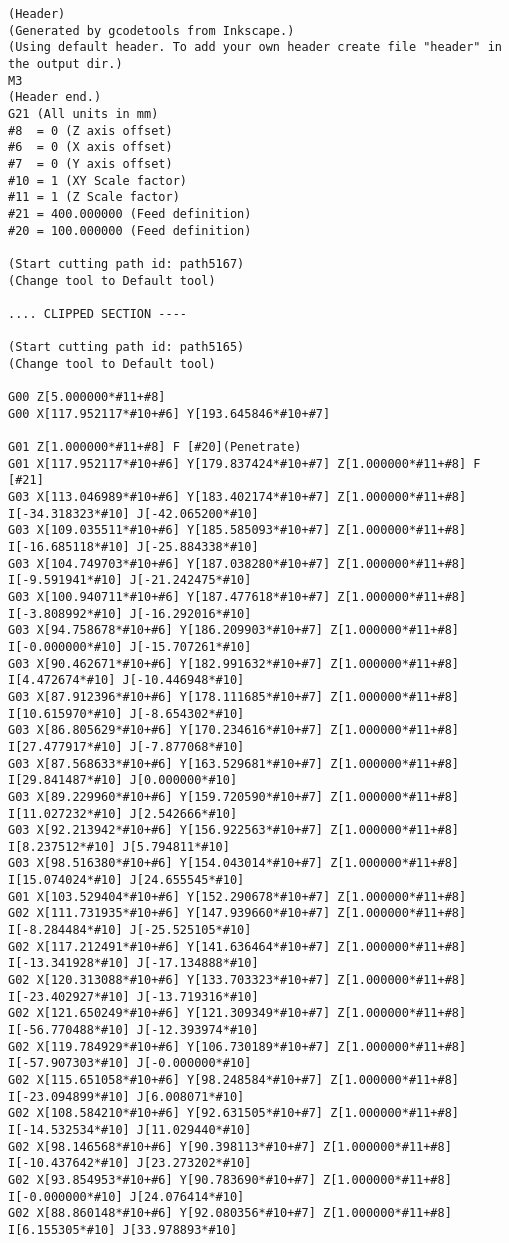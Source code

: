 \begin{lstlisting}[caption={App4-Display excerpt listing for 2D KSG G-Code}, label=App4-Display excerpt listing for 2D KSG G-Code]
%
(Header)
(Generated by gcodetools from Inkscape.)
(Using default header. To add your own header create file "header" in the output dir.)
M3
(Header end.)
G21 (All units in mm)
#8  = 0 (Z axis offset)
#6  = 0 (X axis offset)
#7  = 0 (Y axis offset)
#10 = 1 (XY Scale factor)
#11 = 1 (Z Scale factor)
#21 = 400.000000 (Feed definition)
#20 = 100.000000 (Feed definition)

(Start cutting path id: path5167)
(Change tool to Default tool)

.... CLIPPED SECTION ----

(Start cutting path id: path5165)
(Change tool to Default tool)

G00 Z[5.000000*#11+#8]
G00 X[117.952117*#10+#6] Y[193.645846*#10+#7]

G01 Z[1.000000*#11+#8] F [#20](Penetrate)
G01 X[117.952117*#10+#6] Y[179.837424*#10+#7] Z[1.000000*#11+#8] F [#21]
G03 X[113.046989*#10+#6] Y[183.402174*#10+#7] Z[1.000000*#11+#8] I[-34.318323*#10] J[-42.065200*#10]
G03 X[109.035511*#10+#6] Y[185.585093*#10+#7] Z[1.000000*#11+#8] I[-16.685118*#10] J[-25.884338*#10]
G03 X[104.749703*#10+#6] Y[187.038280*#10+#7] Z[1.000000*#11+#8] I[-9.591941*#10] J[-21.242475*#10]
G03 X[100.940711*#10+#6] Y[187.477618*#10+#7] Z[1.000000*#11+#8] I[-3.808992*#10] J[-16.292016*#10]
G03 X[94.758678*#10+#6] Y[186.209903*#10+#7] Z[1.000000*#11+#8] I[-0.000000*#10] J[-15.707261*#10]
G03 X[90.462671*#10+#6] Y[182.991632*#10+#7] Z[1.000000*#11+#8] I[4.472674*#10] J[-10.446948*#10]
G03 X[87.912396*#10+#6] Y[178.111685*#10+#7] Z[1.000000*#11+#8] I[10.615970*#10] J[-8.654302*#10]
G03 X[86.805629*#10+#6] Y[170.234616*#10+#7] Z[1.000000*#11+#8] I[27.477917*#10] J[-7.877068*#10]
G03 X[87.568633*#10+#6] Y[163.529681*#10+#7] Z[1.000000*#11+#8] I[29.841487*#10] J[0.000000*#10]
G03 X[89.229960*#10+#6] Y[159.720590*#10+#7] Z[1.000000*#11+#8] I[11.027232*#10] J[2.542666*#10]
G03 X[92.213942*#10+#6] Y[156.922563*#10+#7] Z[1.000000*#11+#8] I[8.237512*#10] J[5.794811*#10]
G03 X[98.516380*#10+#6] Y[154.043014*#10+#7] Z[1.000000*#11+#8] I[15.074024*#10] J[24.655545*#10]
G01 X[103.529404*#10+#6] Y[152.290678*#10+#7] Z[1.000000*#11+#8]
G02 X[111.731935*#10+#6] Y[147.939660*#10+#7] Z[1.000000*#11+#8] I[-8.284484*#10] J[-25.525105*#10]
G02 X[117.212491*#10+#6] Y[141.636464*#10+#7] Z[1.000000*#11+#8] I[-13.341928*#10] J[-17.134888*#10]
G02 X[120.313088*#10+#6] Y[133.703323*#10+#7] Z[1.000000*#11+#8] I[-23.402927*#10] J[-13.719316*#10]
G02 X[121.650249*#10+#6] Y[121.309349*#10+#7] Z[1.000000*#11+#8] I[-56.770488*#10] J[-12.393974*#10]
G02 X[119.784929*#10+#6] Y[106.730189*#10+#7] Z[1.000000*#11+#8] I[-57.907303*#10] J[-0.000000*#10]
G02 X[115.651058*#10+#6] Y[98.248584*#10+#7] Z[1.000000*#11+#8] I[-23.094899*#10] J[6.008071*#10]
G02 X[108.584210*#10+#6] Y[92.631505*#10+#7] Z[1.000000*#11+#8] I[-14.532534*#10] J[11.029440*#10]
G02 X[98.146568*#10+#6] Y[90.398113*#10+#7] Z[1.000000*#11+#8] I[-10.437642*#10] J[23.273202*#10]
G02 X[93.854953*#10+#6] Y[90.783690*#10+#7] Z[1.000000*#11+#8] I[-0.000000*#10] J[24.076414*#10]
G02 X[88.860148*#10+#6] Y[92.080356*#10+#7] Z[1.000000*#11+#8] I[6.155305*#10] J[33.978893*#10]


\end{lstlisting}
